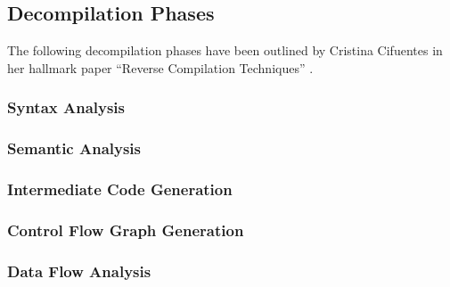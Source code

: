 \documentclass[12pt, a4paper]{article}
\begin{document}

\subsection{Decompilation Phases}


The following decompilation phases have been outlined by Cristina Cifuentes in
her hallmark paper ``Reverse Compilation Techniques'' \cite{rev_comp}.


\subsubsection{Syntax Analysis}


\subsubsection{Semantic Analysis}


\subsubsection{Intermediate Code Generation}


\subsubsection{Control Flow Graph Generation}


\subsubsection{Data Flow Analysis}

\cite{type_decomp}

\end{document}
